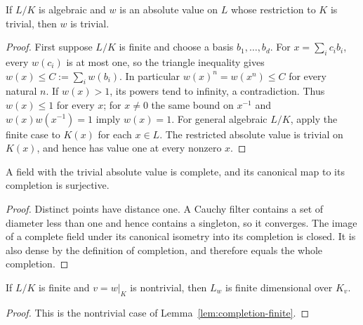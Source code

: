 \begin{lemma}
\label{lem:trivial-algebraic-extension}
\leanok
{}
If $L/K$ is algebraic and $w$ is an absolute value on $L$ whose
restriction to $K$ is trivial, then $w$ is trivial.
\end{lemma}
\begin{proof}
First suppose $L/K$ is finite and choose a basis $b_1,\ldots,b_d$.
For $x=\sum_i c_i b_i$, every $w(c_i)$ is at most one, so the
triangle inequality gives $w(x)\leq C:=\sum_i w(b_i)$.
In particular $w(x)^n=w(x^n)\leq C$ for every natural $n$.
If $w(x)>1$, its powers tend to infinity, a contradiction.
Thus $w(x)\leq1$ for every $x$; for $x\ne0$ the same bound on
$x^{-1}$ and $w(x)w(x^{-1})=1$ imply $w(x)=1$.
For general algebraic $L/K$, apply the finite case to $K(x)$
for each $x\in L$. The restricted absolute value is trivial on $K(x)$,
and hence has value one at every nonzero $x$.
\end{proof}

\begin{lemma}
\label{lem:trivial-completion}
\leanok
{}
A field with the trivial absolute value is complete, and its canonical
map to its completion is surjective.
\end{lemma}
\begin{proof}
Distinct points have distance one. A Cauchy filter contains a set of
diameter less than one and hence contains a singleton, so it converges.
The image of a complete field under its canonical isometry into its
completion is closed. It is also dense by the definition of completion,
and therefore equals the whole completion.
\end{proof}

\begin{lemma}
\label{lem:completion-finite-nontrivial}
\leanok
{}
If $L/K$ is finite and $v=w|_K$ is nontrivial, then $L_w$ is finite
dimensional over $K_v$.
\end{lemma}
\begin{proof}
This is the nontrivial case of Lemma~\ref{lem:completion-finite}.
\end{proof}

